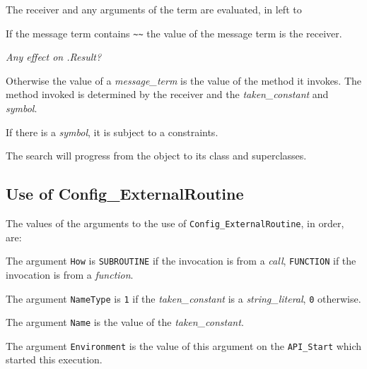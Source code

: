 The receiver and any arguments of the term are evaluated, in left to


If the message term contains
\texttt{\textquotesingle{}\textasciitilde{}\textasciitilde{}\textquotesingle{}}
the value of the message term is the receiver.

\emph{Any effect on .Result?}

Otherwise the value of a \emph{message\_term} is the value of the method
it invokes. The method invoked is determined by the receiver and the
\emph{taken\_constant} and \emph{symbol}.



If there is a \emph{symbol}, it is subject to a constraints.



The search will progress from the object to its class and superclasses.



\subsection{Use of
Config\_ExternalRoutine}\label{use-of-config_externalroutine}

The values of the arguments to the use of
\texttt{Config\_ExternalRoutine}, in order, are:

The argument \texttt{How} is
\texttt{\textquotesingle{}SUBROUTINE\textquotesingle{}} if the
invocation is from a \emph{call},
\texttt{\textquotesingle{}FUNCTION\textquotesingle{}} if the invocation
is from a \emph{function}.

The argument \texttt{NameType} is
\texttt{\textquotesingle{}1\textquotesingle{}} if the
\emph{taken\_constant} is a \emph{string\_literal},
\texttt{\textquotesingle{}0\textquotesingle{}} otherwise.

The argument \texttt{Name} is the value of the \emph{taken\_constant}.

The argument \texttt{Environment} is the value of this argument on the
\texttt{API\_Start} which started this execution.

